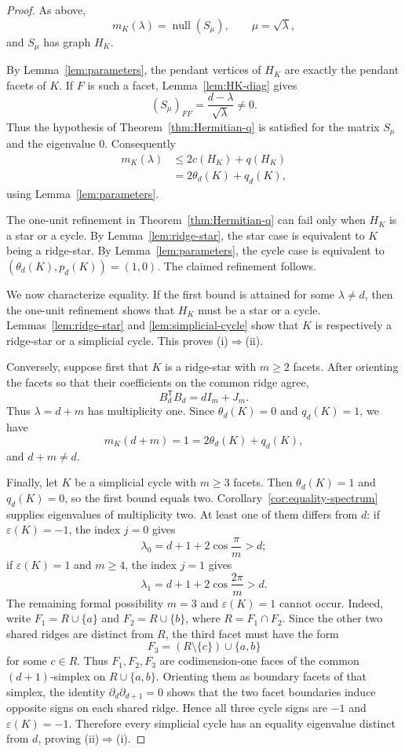 \documentclass[12pt]{article}
\theoremstyle{remark}
\newcommand{\nullity}{\operatorname{null}}
\begin{document}
\begin{proof}
As above,
\[
m_K(\lambda)=\nullity(S_\mu),\qquad \mu=\sqrt\lambda,
\]
and $S_\mu$ has graph $H_K$.

By Lemma~\ref{lem:parameters}, the pendant vertices of $H_K$ are exactly the pendant facets of $K$.  If $F$ is such a facet, Lemma~\ref{lem:HK-diag} gives
\[
(S_\mu)_{FF}=\frac{d-\lambda}{\sqrt\lambda}\ne0.
\]
Thus the hypothesis of Theorem~\ref{thm:Hermitian-q} is satisfied for the matrix $S_\mu$ and the eigenvalue $0$.  Consequently
\[
\begin{aligned}
m_K(\lambda)
&\le2c(H_K)+q(H_K)\\
&=2\theta_d(K)+q_d(K),
\end{aligned}
\]
using Lemma~\ref{lem:parameters}.

The one-unit refinement in Theorem~\ref{thm:Hermitian-q} can fail only when $H_K$ is a star or a cycle.  By Lemma~\ref{lem:ridge-star}, the star case is equivalent to $K$ being a ridge-star.  By Lemma~\ref{lem:parameters}, the cycle case is equivalent to $(\theta_d(K),p_d(K))=(1,0)$.  The claimed refinement follows.

We now characterize equality.  If the first bound is attained for some $\lambda\ne d$, then the one-unit refinement shows that $H_K$ must be a star or a cycle.  Lemmas~\ref{lem:ridge-star} and \ref{lem:simplicial-cycle} show that $K$ is respectively a ridge-star or a simplicial cycle.  This proves (i)$\Rightarrow$(ii).

Conversely, suppose first that $K$ is a ridge-star with $m\ge2$ facets.  After orienting the facets so that their coefficients on the common ridge agree,
\[
B_d^{\mathsf T}B_d=dI_m+J_m.
\]
Thus $\lambda=d+m$ has multiplicity one.  Since $\theta_d(K)=0$ and $q_d(K)=1$, we have
\[
m_K(d+m)=1=2\theta_d(K)+q_d(K),
\]
and $d+m\ne d$.

Finally, let $K$ be a simplicial cycle with $m\ge3$ facets.  Then $\theta_d(K)=1$ and $q_d(K)=0$, so the first bound equals two.  Corollary~\ref{cor:equality-spectrum} supplies eigenvalues of multiplicity two.  At least one of them differs from $d$: if $\varepsilon(K)=-1$, the index $j=0$ gives
\[
\lambda_0=d+1+2\cos\frac{\pi}{m}>d;
\]
if $\varepsilon(K)=1$ and $m\ge4$, the index $j=1$ gives
\[
\lambda_1=d+1+2\cos\frac{2\pi}{m}>d.
\]
The remaining formal possibility $m=3$ and $\varepsilon(K)=1$ cannot occur.  Indeed, write $F_1=R\cup\{a\}$ and $F_2=R\cup\{b\}$, where $R=F_1\cap F_2$.  Since the other two shared ridges are distinct from $R$, the third facet must have the form
\[
F_3=(R\setminus\{c\})\cup\{a,b\}
\]
for some $c\in R$.  Thus $F_1,F_2,F_3$ are codimension-one faces of the common $(d+1)$-simplex on $R\cup\{a,b\}$.  Orienting them as boundary facets of that simplex, the identity $\partial_d\partial_{d+1}=0$ shows that the two facet boundaries induce opposite signs on each shared ridge.  Hence all three cycle signs are $-1$ and $\varepsilon(K)=-1$.  Therefore every simplicial cycle has an equality eigenvalue distinct from $d$, proving (ii)$\Rightarrow$(i).
\end{proof}
\end{document}
